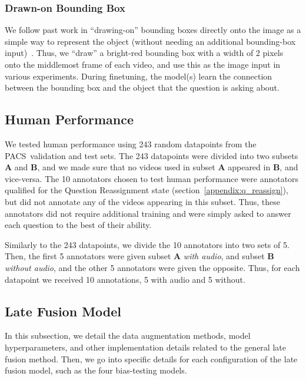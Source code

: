 \documentclass[runningheads]{llncs}
\newcommand{\names}{\textsc{PACS}}
\begin{document}
\subsubsection{Drawn-on Bounding Box} We follow past work in ``drawing-on'' bounding boxes directly onto the image as a simple way to represent the object (without needing an additional bounding-box input)~\cite{zellers2022merlotreserve,zellers2021merlot}. Thus, we ``draw'' a bright-red bounding box with a width of 2 pixels onto the middlemost frame of each video, and use this as the image input in various experiments. During finetuning, the model(s) learn the connection between the bounding box and the object that the question is asking about. 

\subsection{Human Performance}

We tested human performance using 243 random datapoints from the \names\ validation and test sets. The 243 datapoints were divided into two subsets $\mathbf{A}$ and $\mathbf{B}$, and we made sure that no videos used in subset $\mathbf{A}$ appeared in $\mathbf{B}$, and vice-versa. The 10 annotators chosen to test human performance were annotators qualified for the Question Reassignment state (section~\ref{appendix:q_reassign}), but did not annotate any of the videos appearing in this subset. Thus, these annotators did not require additional training and were simply asked to answer each question to the best of their ability. 

Similarly to the 243 datapoints, we divide the 10 annotators into two sets of 5. Then, the first 5 annotators were given subset $\mathbf{A}$ \textit{with audio}, and subset $\mathbf{B}$ \textit{without audio}, and the other 5 annotators were given the opposite. Thus, for each datapoint we received 10 annotations, 5 with audio and 5 without. 

\subsection{Late Fusion Model~\cite{pandeya2021fusion}}

In this subsection, we detail the data augmentation methods, model hyperparameters, and other implementation details related to the general late fusion method. Then, we go into specific details for each configuration of the late fusion model, such as the four bias-testing models.
\end{document}
